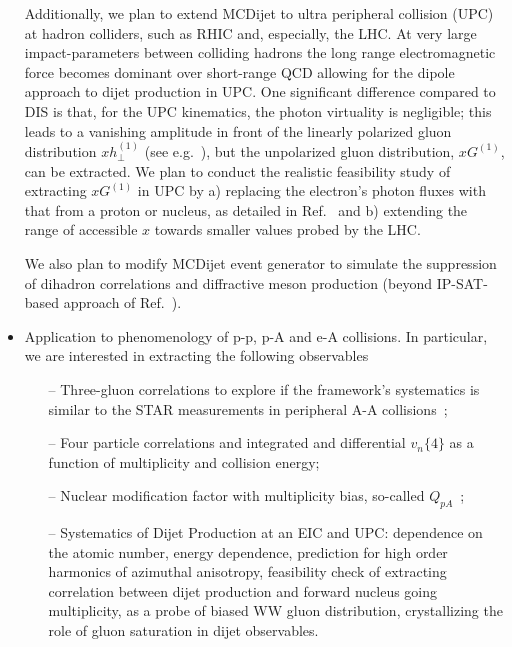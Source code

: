 \begin{itemize}
				Additionally, we plan to extend MCDijet to ultra peripheral collision  (UPC) at hadron 
				colliders, such as RHIC and, especially, the LHC. 
				At very large impact-parameters between colliding hadrons the long range electromagnetic
				force becomes dominant over short-range QCD allowing for the dipole approach to 
				dijet production in UPC. One significant difference compared to DIS is that, for
				the UPC kinematics, the photon virtuality  is negligible; 
				this leads to a vanishing amplitude in front of the linearly polarized gluon 
				distribution $x h^{(1)}_\perp$ (see e.g.~\cite{Dominguez:2011br}), 
				but the unpolarized gluon distribution, $xG^{(1)}$,  can be extracted. 
				We plan to conduct the realistic feasibility study of extracting  $xG^{(1)}$ in UPC 
				by 
				a) replacing the electron's photon fluxes with that from a proton or nucleus, as detailed in 
				Ref.~\cite{Klein:1999gv}
				and b) extending the range of accessible $x$ towards smaller values probed by  the LHC. 

				We also plan to modify MCDijet event generator to simulate the 
				suppression of dihadron correlations and diffractive meson production (beyond IP-SAT-based approach of Ref.~\cite{Toll:2012mb}). 	

			\item Application to phenomenology of p-p, p-A and e-A collisions. 
				In particular, we are interested in extracting the following observables 
				\begin{itemize}
					\item[--] Three-gluon correlations to explore if 
						the framework's systematics is similar to the STAR measurements
						in peripheral A-A collisions~\cite{Adamczyk:2017hdl,Adamczyk:2017byf};  	
					\item[--] Four particle correlations and integrated and differential $v_n\{4\}$ as a function of  multiplicity and collision energy; 
					\item[--] Nuclear modification factor with multiplicity bias, so-called $Q_{pA}$~\cite{Adam:2014qja};   
					\item[--] 
					Systematics of Dijet Production at an EIC and UPC: 
					dependence on the atomic number, energy dependence, 
					prediction for high order harmonics of azimuthal anisotropy, 
					feasibility check of extracting correlation between dijet production and forward nucleus going  multiplicity, as a probe of biased WW gluon distribution, crystallizing the role of gluon saturation in dijet observables.  
				\end{itemize}
		\end{itemize} 
		
